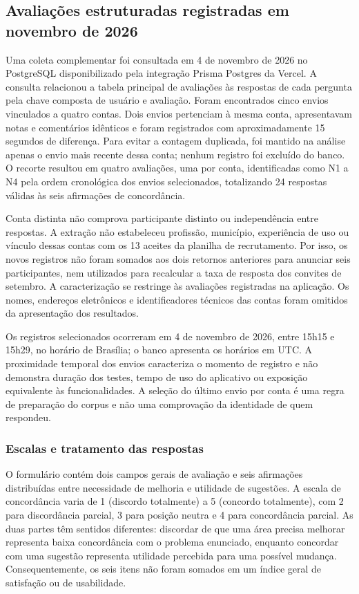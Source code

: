 \subsection{Avaliações estruturadas registradas em novembro de 2026}
\label{sec:feedbacks_novembro}

Uma coleta complementar foi consultada em 4 de novembro de 2026 no PostgreSQL disponibilizado pela integração Prisma Postgres da Vercel. A consulta relacionou a tabela principal de avaliações às respostas de cada pergunta pela chave composta de usuário e avaliação. Foram encontrados cinco envios vinculados a quatro contas. Dois envios pertenciam à mesma conta, apresentavam notas e comentários idênticos e foram registrados com aproximadamente 15 segundos de diferença. Para evitar a contagem duplicada, foi mantido na análise apenas o envio mais recente dessa conta; nenhum registro foi excluído do banco. O recorte resultou em quatro avaliações, uma por conta, identificadas como N1 a N4 pela ordem cronológica dos envios selecionados, totalizando 24 respostas válidas às seis afirmações de concordância.

Conta distinta não comprova participante distinto ou independência entre respostas. A extração não estabeleceu profissão, município, experiência de uso ou vínculo dessas contas com os 13 aceites da planilha de recrutamento. Por isso, os novos registros não foram somados aos dois retornos anteriores para anunciar seis participantes, nem utilizados para recalcular a taxa de resposta dos convites de setembro. A caracterização se restringe às avaliações registradas na aplicação. Os nomes, endereços eletrônicos e identificadores técnicos das contas foram omitidos da apresentação dos resultados.

Os registros selecionados ocorreram em 4 de novembro de 2026, entre 15h15 e 15h29, no horário de Brasília; o banco apresenta os horários em UTC. A proximidade temporal dos envios caracteriza o momento de registro e não demonstra duração dos testes, tempo de uso do aplicativo ou exposição equivalente às funcionalidades. A seleção do último envio por conta é uma regra de preparação do corpus e não uma comprovação da identidade de quem respondeu.

\subsubsection{Escalas e tratamento das respostas}

O formulário contém dois campos gerais de avaliação e seis afirmações distribuídas entre necessidade de melhoria e utilidade de sugestões. A escala de concordância varia de 1 (discordo totalmente) a 5 (concordo totalmente), com 2 para discordância parcial, 3 para posição neutra e 4 para concordância parcial. As duas partes têm sentidos diferentes: discordar de que uma área precisa melhorar representa baixa concordância com o problema enunciado, enquanto concordar com uma sugestão representa utilidade percebida para uma possível mudança. Consequentemente, os seis itens não foram somados em um índice geral de satisfação ou de usabilidade.

